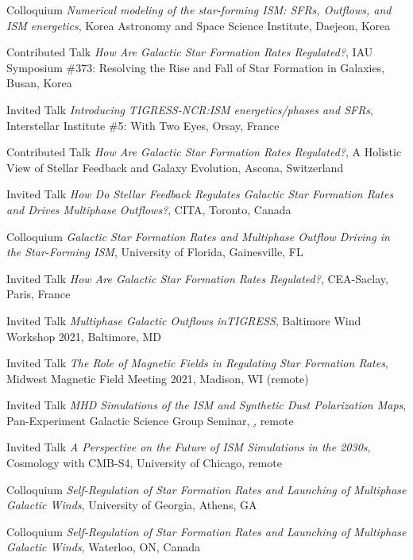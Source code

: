 \documentclass[12pt]{article}
\begin{document}
{Colloquium}
{\emph{Numerical modeling of the star-forming ISM:  SFRs, Outflows, and ISM energetics},
Korea Astronomy and Space Science Institute,
Daejeon, Korea}

{Contributed Talk}
{\emph{How Are Galactic Star Formation Rates Regulated?},
IAU Symposium \#373: Resolving the Rise and Fall of Star Formation in Galaxies,
Busan, Korea}

{Invited Talk}
{\emph{Introducing TIGRESS-NCR:ISM energetics/phases and SFRs},
Interstellar Institute \#5: With Two Eyes,
Orsay, France}

{Contributed Talk}
{\emph{How Are Galactic Star Formation Rates Regulated?},
A Holistic View of Stellar Feedback and Galaxy Evolution,
Ascona, Switzerland}

{Invited Talk}
{\emph{How Do Stellar Feedback Regulates Galactic Star Formation Rates and Drives Multiphase Outflows?},
CITA,
Toronto, Canada}

{Colloquium}
{\emph{Galactic Star Formation Rates and Multiphase Outflow Driving in the Star-Forming ISM},
University of Florida,
Gainesville, FL}

{Invited Talk}
{\emph{How Are Galactic Star Formation Rates Regulated?},
CEA-Saclay,
Paris, France}

{Invited Talk}
{\emph{Multiphase Galactic Outflows inTIGRESS},
Baltimore Wind Workshop 2021,
Baltimore, MD}

{Invited Talk}
{\emph{The Role of Magnetic Fields in Regulating Star Formation Rates},
Midwest Magnetic Field Meeting 2021,
Madison, WI (remote)}

{Invited Talk}
{\emph{MHD Simulations of the ISM and Synthetic Dust Polarization Maps},
Pan-Experiment Galactic Science Group Seminar,
\href{https://galsci.github.io}, remote}

{Invited Talk}
{\emph{A Perspective on the Future of ISM Simulations in the 2030s},
Cosmology with CMB-S4,
University of Chicago, remote}

{Colloquium}
{\emph{Self-Regulation of Star Formation Rates and Launching of Multiphase Galactic Winds},
University of Georgia,
Athens, GA}

{Colloquium}
{\emph{Self-Regulation of Star Formation Rates and Launching of Multiphase Galactic Winds},
Waterloo,
ON, Canada}
\end{document}
